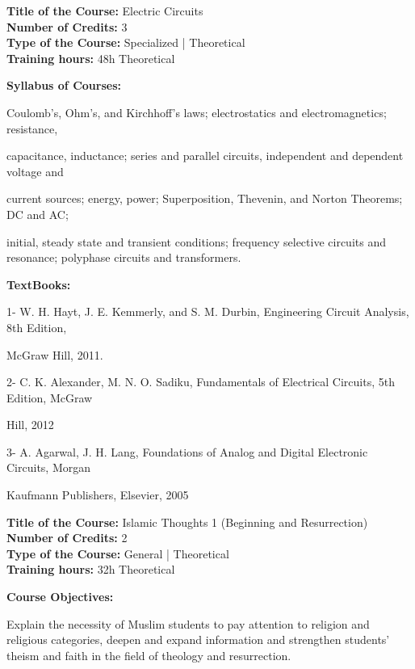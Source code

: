 \documentclass[12pt,a4paper]{article}
\begin{document}
\newpage
\textbf{Title of the Course:} Electric Circuits\\
\textbf{Number of Credits:} 3\\
\textbf{Type of the Course:} Specialized | Theoretical\\
\textbf{Training hours:} 48h Theoretical\par\vspace{4pt}
\textbf{Syllabus of Courses:}\par\vspace{2pt}
Coulomb's, Ohm's, and Kirchhoff’s laws; electrostatics and electromagnetics; resistance,\par
capacitance, inductance; series and parallel circuits, independent and dependent voltage and\par
current sources; energy, power; Superposition, Thevenin, and Norton Theorems; DC and AC;\par
initial, steady state and transient conditions; frequency selective circuits and resonance; polyphase circuits and transformers.\par\vspace{4pt}
\textbf{TextBooks:}\par\vspace{2pt}
1- W. H. Hayt, J. E. Kemmerly, and S. M. Durbin, Engineering Circuit Analysis, 8th Edition,\par
McGraw Hill, 2011.\par
2- C. K. Alexander, M. N. O. Sadiku, Fundamentals of Electrical Circuits, 5th Edition, McGraw\par
Hill, 2012\par
3- A. Agarwal, J. H. Lang, Foundations of Analog and Digital Electronic Circuits, Morgan\par
Kaufmann Publishers, Elsevier, 2005\par
\vspace{4pt}

\newpage
\nopagebreak
\textbf{Title of the Course:} Islamic Thoughts 1 (Beginning and Resurrection)\\
\textbf{Number of Credits:} 2\\
\textbf{Type of the Course:} General | Theoretical\\
\textbf{Training hours:} 32h Theoretical\par\vspace{4pt}
\textbf{Course Objectives:}\par\vspace{2pt}
Explain the necessity of Muslim students to pay attention to religion and religious categories,
deepen and expand information and strengthen students' theism and faith in the field of theology
and resurrection.\par\vspace{4pt}
\end{document}
